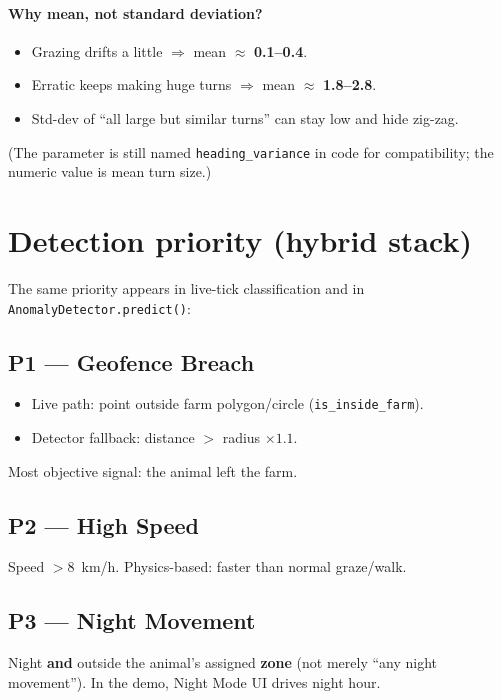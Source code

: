 \documentclass[11pt,a4paper]{article}
\begin{document}
\paragraph{Why mean, not standard deviation?}
\begin{itemize}[leftmargin=*]
  \item Grazing drifts a little $\Rightarrow$ mean $\approx$ \textbf{0.1--0.4}.
  \item Erratic keeps making huge turns $\Rightarrow$ mean $\approx$ \textbf{1.8--2.8}.
  \item Std-dev of ``all large but similar turns'' can stay low and hide zig-zag.
\end{itemize}

(The parameter is still named \texttt{heading\_variance} in code for compatibility;
the numeric value is mean turn size.)

\section{Detection priority (hybrid stack)}

The same priority appears in live-tick classification and in
\texttt{AnomalyDetector.predict()}:

\subsection{P1 --- Geofence Breach}
\begin{itemize}[leftmargin=*]
  \item Live path: point outside farm polygon/circle (\texttt{is\_inside\_farm}).
  \item Detector fallback: distance $>$ radius $\times 1.1$.
\end{itemize}
Most objective signal: the animal left the farm.

\subsection{P2 --- High Speed}
Speed $> 8$~km/h. Physics-based: faster than normal graze/walk.

\subsection{P3 --- Night Movement}
Night \textbf{and} outside the animal's assigned \textbf{zone}
(not merely ``any night movement''). In the demo, Night Mode UI drives night hour.
\end{document}
